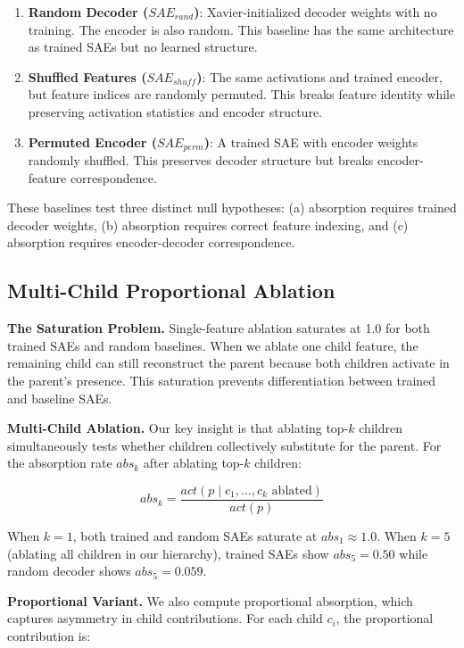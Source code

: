 \documentclass{article}
\begin{document}
\begin{enumerate}
\item \textbf{Random Decoder ($SAE_{rand}$)}: Xavier-initialized decoder weights with no training. The encoder is also random. This baseline has the same architecture as trained SAEs but no learned structure.

\item \textbf{Shuffled Features ($SAE_{shuff}$)}: The same activations and trained encoder, but feature indices are randomly permuted. This breaks feature identity while preserving activation statistics and encoder structure.

\item \textbf{Permuted Encoder ($SAE_{perm}$)}: A trained SAE with encoder weights randomly shuffled. This preserves decoder structure but breaks encoder-feature correspondence.
\end{enumerate}

These baselines test three distinct null hypotheses: (a) absorption requires trained decoder weights, (b) absorption requires correct feature indexing, and (c) absorption requires encoder-decoder correspondence.

\subsection{Multi-Child Proportional Ablation}

\textbf{The Saturation Problem.} Single-feature ablation saturates at 1.0 for both trained SAEs and random baselines. When we ablate one child feature, the remaining child can still reconstruct the parent because both children activate in the parent's presence. This saturation prevents differentiation between trained and baseline SAEs.

\textbf{Multi-Child Ablation.} Our key insight is that ablating top-$k$ children simultaneously tests whether children collectively substitute for the parent. For the absorption rate $abs_k$ after ablating top-$k$ children:

\begin{equation}
abs_k = \frac{act(p \mid c_1, \ldots, c_k \text{ ablated})}{act(p)}
\end{equation}

When $k=1$, both trained and random SAEs saturate at $abs_1 \approx 1.0$. When $k=5$ (ablating all children in our hierarchy), trained SAEs show $abs_5 = 0.50$ while random decoder shows $abs_5 = 0.059$.

\textbf{Proportional Variant.} We also compute proportional absorption, which captures asymmetry in child contributions. For each child $c_i$, the proportional contribution is:
\end{document}
